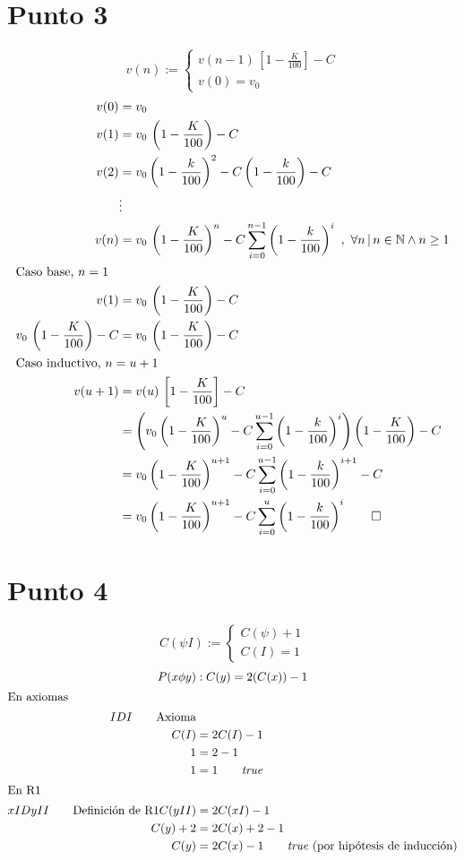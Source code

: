 \documentclass{article}
\begin{document}
\section{Punto 3}
\begin{equation*}
    v(n) :=
    \begin{cases}
        v(n-1)\,\left[1-\frac{K}{100}\right] - C\\
        v(0) = v_0
    \end{cases}
\end{equation*}
\begin{alignat*}{2}
    v(0) &= v_0\\
    v(1) &= v_0\,\left(1-\frac{K}{100}\right) - C\\
    v(2) &= v_0\left(1 - \frac{k}{100}\right)^2 - C\left(1 - \frac{k}{100}\right) - C\\
    &\vdots\\
    v(n) &= v_0\,\left(1-\frac{K}{100}\right)^n - C \sum_{i=0}^{n-1}\left(1 - \frac{k}{100}\right)^i \ ,\ \forall n\,\vert\, n \in \mathbb{N} \wedge n \geq 1\\
    \intertext{Caso base, $n=1$}
    v(1) &= v_0 \,\left(1-\frac{K}{100}\right) - C\\
    v_0\,\left(1-\frac{K}{100}\right) -C &= v_0 \,\left(1-\frac{K}{100}\right) - C\\
    \intertext{Caso inductivo, $n = u+1$}
    v(u+1) &= v(u)\,\left[1 - \frac{K}{100}\right]-C\\
    &=\left(v_0\left(1-\frac{K}{100}\right)^u - C \sum_{i=0}^{u-1}\left(1 - \frac{k}{100}\right)^i\right)\left(1-\frac{K}{100}\right) - C\\
    &= v_0\left(1-\frac{K}{100}\right)^{u+1} - C \sum_{i=0}^{u-1}\left(1 - \frac{k}{100}\right)^{i+1} - C\\
    &= v_0\left(1-\frac{K}{100}\right)^{u+1} - C \sum_{i=0}^{u}\left(1 - \frac{k}{100}\right)^{i} \tag*{$\Box$}
\end{alignat*}
\section{Punto 4}
\begin{equation*}
    C(\psi I) :=
    \begin{cases}
        C(\psi) + 1\\
        C(I) = 1
    \end{cases}
\end{equation*}
\begin{alignat*}{2}
    P(x\phi y)&: C(y) = 2(C(x)) - 1\\
    \intertext{En axiomas}
    IDI \tag*{Axioma}\\
    C(I) &= 2C(I) - 1\\
    1 &= 2 - 1\\
    1 &= 1 \tag*{\textit{true}}\\
    \intertext{En R1}
    xIDyII \tag*{Definición de R1}
    C(yII) &= 2C(xI) - 1\\
    C(y) + 2 &= 2C(x) + 2 - 1\\
    C(y) &= 2C(x) - 1 \tag*{\textit{true} (por hipótesis de inducción)}
\end{alignat*}
\end{document}
